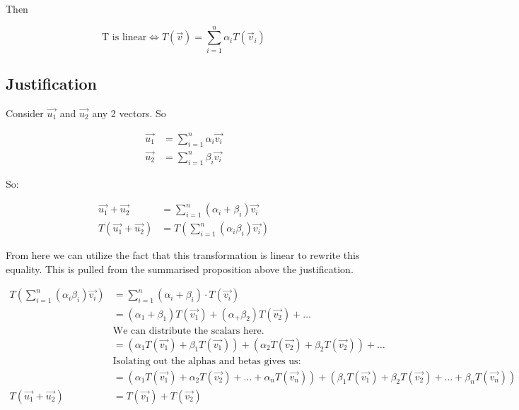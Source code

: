 \documentclass[a4paper]{article}
\begin{document}
Then

\[\text{T is linear} \iff T(\vec{v}) = \sum_{i=1}^{n}\alpha_i T(\vec{v}_i)\]

\subsection*{Justification}

Consider $\vec{u_1}$ and $\vec{u_2}$ any 2 vectors. 
So

\[
	\begin{aligned}
		\vec{u_1} &= \sum^{n}_{i=1} \alpha_i \vec{v_i} \\[3mm]
		\vec{u_2} &= \sum^{n}_{i=1} \beta_i \vec{v_i} 
	\end{aligned}
\]

So:

\[
	\begin{aligned}
		\vec{u_1} + \vec{u_2} &= \sum^{n}_{i=1} (\alpha_i + \beta_i) \vec{v_i} \\
		T\left(\vec{u_1} + \vec{u_2}\right) &= T\left(\sum^{n}_{i=1} (\alpha_i \beta_i) \vec{v_i}\right)
	\end{aligned}
\]

From here we can utilize the fact that this transformation is linear to rewrite this equality. This is pulled from the summarised proposition above the justification.

\[
	\begin{aligned}
		T\left(\sum^{n}_{i=1} (\alpha_i \beta_i) \vec{v_i}\right) &= \sum_{i=1}^{n} \left( \alpha_i + \beta_i \right) \cdot T(\vec{v_i})\\[3mm]
		&= \left( \alpha_1 + \beta_1 \right) T(\vec{v_1}) + \left( \alpha_ + \beta_2 \right) T(\vec{v_2}) + \dots \\[3mm]
		&\text{We can distribute the scalars here.} \\[3mm]
		&= \left( \alpha_1 T(\vec{v_1}) + \beta_1 T(\vec{v_1}) \right) + \left( \alpha_2 T(\vec{v_2}) + \beta_2 T(\vec{v_2}) \right) + \dots \\[3mm]
		&\text{Isolating out the alphas and betas gives us:} \\[3mm]
		&= \left( \alpha_1 T(\vec{v_1}) + \alpha_2 T(\vec{v_2}) + \dots + \alpha_n T(\vec{v_n}) \right) +		\left( \beta_1 T(\vec{v_1}) + \beta_2 T(\vec{v_2}) + \dots + \beta_n T(\vec{v_n}) \right) \\[3mm]
		T\left(\vec{u_1} + \vec{u_2}\right) &= T(\vec{v_1}) + T(\vec{v_2})
	\end{aligned}
\]
\end{document}
